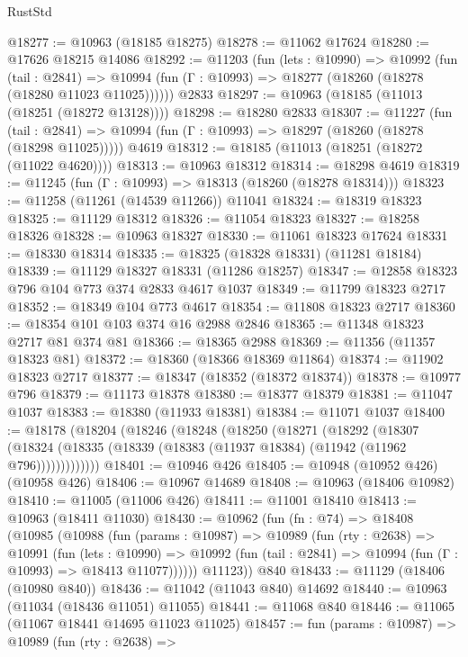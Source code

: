 \begin{lexlean}{RustStd}
\begin{coremodule}
@18277 := @10963 (@18185 @18275)
@18278 := @11062 @17624
@18280 := @17626 @18215 @14086
@18292 := @11203
    (fun (lets : @10990) =>
    @10992
      (fun (tail : @2841) =>
      @10994 (fun (Γ : @10993) => @18277 (@18260 (@18278 (@18280 @11023 @11025))))))
    @2833
@18297 := @10963 (@18185 (@11013 (@18251 (@18272 @13128))))
@18298 := @18280 @2833
@18307 := @11227
    (fun (tail : @2841) => @10994 (fun (Γ : @10993) => @18297 (@18260 (@18278 (@18298 @11025)))))
    @4619
@18312 := @18185 (@11013 (@18251 (@18272 (@11022 @4620))))
@18313 := @10963 @18312
@18314 := @18298 @4619
@18319 := @11245 (fun (Γ : @10993) => @18313 (@18260 (@18278 @18314)))
@18323 := @11258 (@11261 (@14539 @11266)) @11041
@18324 := @18319 @18323
@18325 := @11129 @18312
@18326 := @11054 @18323
@18327 := @18258 @18326
@18328 := @10963 @18327
@18330 := @11061 @18323 @17624
@18331 := @18330 @18314
@18335 := @18325 (@18328 @18331) (@11281 @18184)
@18339 := @11129 @18327 @18331 (@11286 @18257)
@18347 := @12858 @18323 @796 @104 @773 @374 @2833 @4617 @1037
@18349 := @11799 @18323 @2717
@18352 := @18349 @104 @773 @4617
@18354 := @11808 @18323 @2717
@18360 := @18354 @101 @103 @374 @16 @2988 @2846
@18365 := @11348 @18323 @2717 @81 @374 @81
@18366 := @18365 @2988
@18369 := @11356 (@11357 @18323 @81)
@18372 := @18360 (@18366 @18369 @11864)
@18374 := @11902 @18323 @2717
@18377 := @18347 (@18352 (@18372 @18374))
@18378 := @10977 @796
@18379 := @11173 @18378
@18380 := @18377 @18379
@18381 := @11047 @1037
@18383 := @18380 (@11933 @18381)
@18384 := @11071 @1037
@18400 := @18178
    (@18204
      (@18246
        (@18248
          (@18250
            (@18271
              (@18292
                (@18307
                  (@18324 (@18335 (@18339 (@18383 (@11937 @18384) (@11942 (@11962 @796)))))))))))))
@18401 := @10946 @426
@18405 := @10948 (@10952 @426) (@10958 @426)
@18406 := @10967 @14689
@18408 := @10963 (@18406 @10982)
@18410 := @11005 (@11006 @426)
@18411 := @11001 @18410
@18413 := @10963 (@18411 @11030)
@18430 := @10962
    (fun (fn : @74) =>
    @18408
      (@10985
        (@10988
          (fun (params : @10987) =>
          @10989
            (fun (rty : @2638) =>
            @10991
              (fun (lets : @10990) =>
              @10992 (fun (tail : @2841) => @10994 (fun (Γ : @10993) => @18413 @11077))))))
        @11123))
    @840
@18433 := @11129 (@18406 (@10980 @840))
@18436 := @11042 (@11043 @840) @14692
@18440 := @10963 (@11034 (@18436 @11051) @11055)
@18441 := @11068 @840
@18446 := @11065 (@11067 @18441 @14695 @11023 @11025)
@18457 := fun (params : @10987) =>
  @10989
    (fun (rty : @2638) =>

\end{coremodule}
\end{lexlean}
